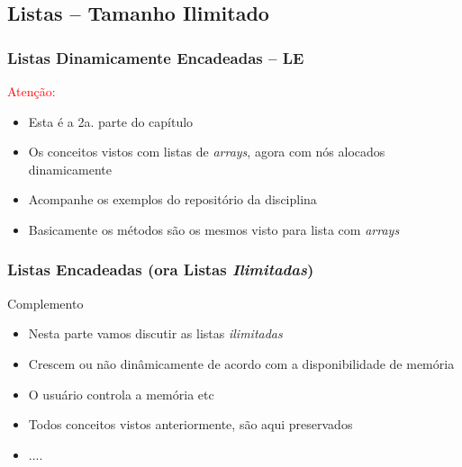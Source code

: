 \subsection{Listas -- Tamanho Ilimitado}
\begin{frame}%
\frametitle{Listas Dinamicamente Encadeadas -- LE}


\begin{block}{\textcolor{red}{Atenção:}}
\begin{itemize}
  \item Esta é a 2a. parte do capítulo
  \item Os conceitos vistos com listas de \textit{arrays}, agora com
  nós alocados dinamicamente
  \item Acompanhe os exemplos do repositório da disciplina
  \item Basicamente os métodos são os mesmos visto para lista com \textit{arrays}
\end{itemize}
\end{block}

\end{frame} 



\begin{frame}
\frametitle{Listas Encadeadas  (ora Listas \textit{Ilimitadas})}

\begin{block}{Complemento}

\begin{itemize}
  \item Nesta parte vamos discutir as listas \textit{ilimitadas}
  \item Crescem ou não dinâmicamente de acordo com a disponibilidade de memória
  \item O usuário controla a memória etc
  \item Todos conceitos vistos anteriormente, são aqui preservados
  \item .... 
\end{itemize}

\end{block}

\end{frame} 



